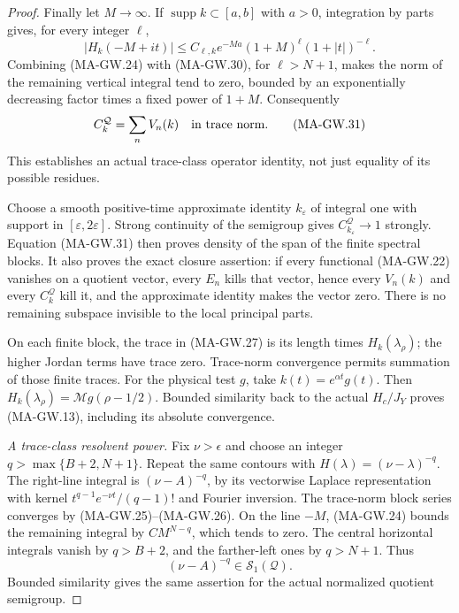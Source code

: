 \begin{proof}
Finally let $M\to\infty$.
If $\operatorname{supp}k\subset[a,b]$ with $a>0$,
integration by parts gives, for every integer $\ell$,
\[
 |H_k(-M+it)|
    \le C_{\ell,k}e^{-Ma}(1+M)^\ell(1+|t|)^{-\ell}.
 \tag{MA-GW.30}
\]
Combining (MA-GW.24) with (MA-GW.30), for $\ell>N+1$,
makes the norm of the remaining vertical integral tend
to zero, bounded by an exponentially decreasing factor
times a fixed power of $1+M$.
Consequently
\[
                    C_k^{\mathcal Q}=\sum_n V_n(k)
                              \quad\hbox{in trace norm}.
 \tag{MA-GW.31}
\]
This establishes an actual trace-class operator identity,
not just equality of its possible residues.

Choose a smooth positive-time approximate identity
$k_\varepsilon$ of integral one with support in
$[\varepsilon,2\varepsilon]$.
Strong continuity of the semigroup gives
$C_{k_\varepsilon}^{\mathcal Q}\to1$ strongly.
Equation (MA-GW.31) then proves density of the span
of the finite spectral blocks.
It also proves the exact closure assertion:
if every functional (MA-GW.22) vanishes on a quotient
vector, every $E_n$ kills that vector, hence
every $V_n(k)$ and every $C_k^{\mathcal Q}$ kill it,
and the approximate identity makes the vector zero.
There is no remaining subspace invisible to the
local principal parts.

On each finite block, the trace in (MA-GW.27) is its
length times $H_k(\lambda_\rho)$; the higher Jordan
terms have trace zero.
Trace-norm convergence permits summation of those
finite traces.
For the physical test $g$, take $k(t)=e^{\alpha t}g(t)$.
Then $H_k(\lambda_\rho)=\mathcal Mg(\rho-1/2)$.
Bounded similarity back to the actual $H_c/J_Y$
proves (MA-GW.13), including its absolute convergence.

\emph{A trace-class resolvent power.}
Fix $\nu>\epsilon$ and choose an integer
$q>\max\{B+2,N+1\}$.
Repeat the same contours with
$H(\lambda)=(\nu-\lambda)^{-q}$.
The right-line integral is
$(\nu-A)^{-q}$, by its vectorwise Laplace representation
with kernel $t^{q-1}e^{-\nu t}/(q-1)!$ and Fourier inversion.
The trace-norm block series converges by (MA-GW.25)--(MA-GW.26).
On the line $-M$, (MA-GW.24) bounds the remaining
integral by $C M^{N-q}$, which tends to zero.
The central horizontal integrals vanish by $q>B+2$,
and the farther-left ones by $q>N+1$.
Thus
\[
                              (\nu-A)^{-q}\in\mathcal S_1(\mathcal Q).
 \tag{MA-GW.32}
\]
Bounded similarity gives the same assertion for the
actual normalized quotient semigroup.
\end{proof}

